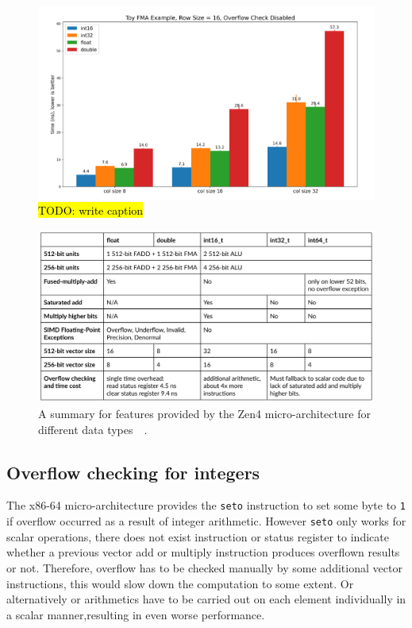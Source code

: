\documentclass[logo,bsc,singlespacing,parskip]{infthesis}
\begin{document}
\begin{figure}[H]
    \includegraphics[width=\linewidth]{image/col8-col16-col32-i16-i32-f32-f64.png}
    \caption{\hl{TODO: write caption}}
    \label{fig:col8-col16-col32-i16-i32-f32-f64}
\end{figure}

\begin{figure}[H]\captionsetup{name=Figure}
\captionsetup{justification=centering}
    \includegraphics[width=\linewidth]{image/arch-table.png}
    \caption{A summary for features provided by the Zen4 micro-architecture
    for different data types~\cite{Zen4Critique}~\cite{Zen2ChipWiki}.}
    \label{archtable}
\end{figure}

\subsection{Overflow checking for integers}
\label{sec:overflow-int}

The x86-64 micro-architecture provides the \texttt{seto} instruction to set some
byte to \texttt{1} if overflow occurred as a result of integer arithmetic.
However \texttt{seto} only works for scalar operations, there does not exist
instruction or status register to indicate whether a previous vector add or
multiply instruction produces overflown results or not. Therefore, overflow has
to be checked manually by some additional vector instructions, this would slow
down the computation to some extent. Or alternatively or arithmetics have to be
carried out on each element individually in a scalar manner,resulting in even
worse performance. 
\end{document}
